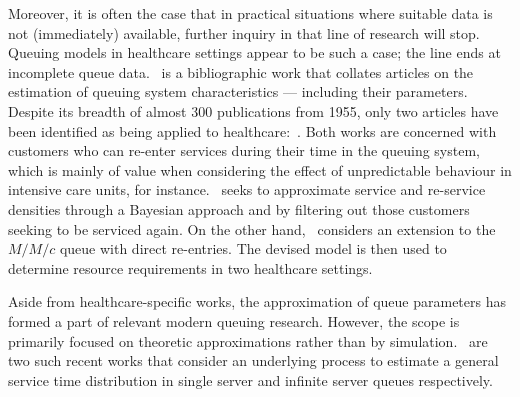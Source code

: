 Moreover, it is often the case that in practical situations where suitable data
is not (immediately) available, further inquiry in that line of research will
stop. Queuing models in healthcare settings appear to be such a case; the line
ends at incomplete queue data.~\cite{Asanjarani2017} is a bibliographic work
that collates articles on the estimation of queuing system characteristics ---
including their parameters. Despite its breadth of almost 300 publications from
1955, only two articles have been identified as being applied to
healthcare:~\cite{Mohammadi2012,Yom2014}. Both works are concerned with
customers who can re-enter services during their time in the queuing system,
which is mainly of value when considering the effect of unpredictable behaviour
in intensive care units, for instance.~\cite{Mohammadi2012} seeks to approximate
service and re-service densities through a Bayesian approach and by filtering
out those customers seeking to be serviced again. On the other
hand,~\cite{Yom2014} considers an extension to the \(M/M/c\) queue with direct
re-entries. The devised model is then used to determine resource requirements in
two healthcare settings.

Aside from healthcare-specific works, the approximation of queue parameters has
formed a part of relevant modern queuing research. However, the scope is
primarily focused on theoretic approximations rather than by
simulation.~\cite{Djabali2018,Goldenshluger2016} are two such recent works that
consider an underlying process to estimate a general service time distribution
in single server and infinite server queues respectively.
